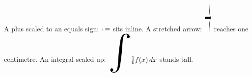 \documentclass{article}
\begin{document}
A plus scaled to an equals sign: $\scalerel[0.5ex]{+}{=}$ sits inline.
A stretched arrow: $\stretchto{\rightarrow}{1cm}$ reaches one centimetre.
An integral scaled up: $\scaleto{\int}{2cm}_{0}^{1} f(x)\,dx$ stands tall.
\end{document}
